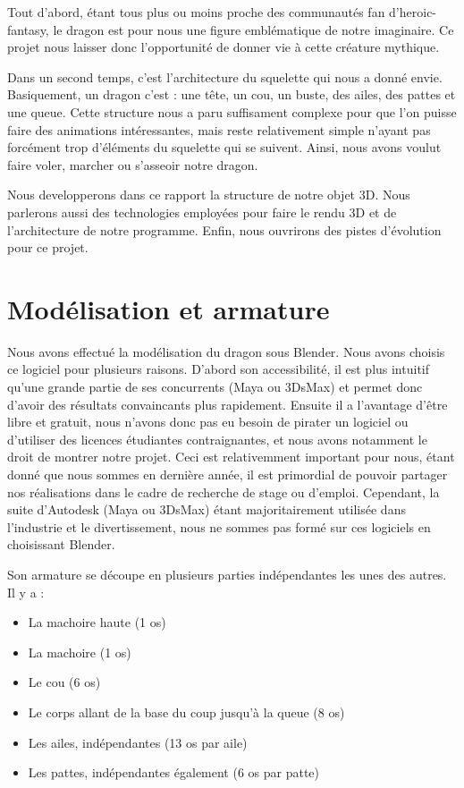 \documentclass[a4paper]{report}
\begin{document}
Tout d'abord, étant tous plus ou moins proche des communautés fan d'heroic-fantasy, le dragon est pour nous une figure emblématique de notre imaginaire. Ce projet nous laisser donc l'opportunité de donner vie à cette créature mythique. 

Dans un second temps, c'est l'architecture du squelette qui nous a donné envie. Basiquement, un dragon c'est : une tête, un cou, un buste, des ailes, des pattes et une queue. Cette structure nous a paru suffisament complexe pour que l'on puisse faire des animations intéressantes, mais reste relativement simple n'ayant pas forcément trop d'éléments du squelette qui se suivent. Ainsi, nous avons voulut faire voler, marcher ou s'asseoir notre dragon.

Nous developperons dans ce rapport la structure de notre objet 3D. Nous parlerons aussi des technologies employées pour faire le rendu 3D et de l'architecture de notre programme. Enfin, nous ouvrirons des pistes d'évolution pour ce projet. 


\newpage
\chapter{Modélisation et armature}
\par
Nous avons effectué la modélisation du dragon sous Blender. Nous avons choisis ce logiciel pour plusieurs raisons. D'abord son accessibilité, il est plus intuitif qu'une grande partie de ses concurrents (Maya ou 3DsMax) et permet donc d'avoir des résultats convaincants plus rapidement. Ensuite il a l'avantage d'être libre et gratuit, nous n'avons donc pas eu besoin de pirater un logiciel ou d'utiliser des licences étudiantes contraignantes, et nous avons notamment le droit de montrer notre projet. Ceci est relativemment important pour nous, étant donné que nous sommes en dernière année, il est primordial de pouvoir partager nos réalisations dans le cadre de recherche de stage ou d'emploi. Cependant, la suite d'Autodesk (Maya ou 3DsMax) étant majoritairement utilisée dans l'industrie et le divertissement, nous ne sommes pas formé sur ces logiciels en choisissant Blender.

Son armature se découpe en plusieurs parties indépendantes les unes des autres. Il y a :
\begin{itemize}
\item La machoire haute (1 os)
\item La machoire (1 os)
\item Le cou (6 os)
\item Le corps allant de la base du coup jusqu'à la queue (8 os)
\item Les ailes, indépendantes (13 os par aile)
\item Les pattes, indépendantes également (6 os par patte)
\end{itemize}
\end{document}
